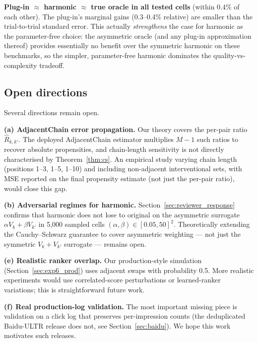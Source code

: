 \documentclass[sigconf]{acmart}
\begin{document}
\noindent\textbf{Plug-in $\approx$ harmonic $\approx$ true oracle in all
tested cells} (within $0.4\%$ of each other). The plug-in's marginal gains
(0.3--0.4\% relative) are smaller than the trial-to-trial standard error.
This actually \emph{strengthens} the case for harmonic as the parameter-free
choice: the asymmetric oracle (and any plug-in approximation thereof)
provides essentially no benefit over the symmetric harmonic on these
benchmarks, so the simpler, parameter-free harmonic dominates the
quality-vs-complexity tradeoff.

\subsection{Open directions}
Several directions remain open.

\textbf{(a) AdjacentChain error propagation.}
Our theory covers the per-pair ratio $\hat{R}_{k,k'}$. The deployed AdjacentChain estimator
multiplies $M-1$ such ratios to recover absolute propensities, and chain-length sensitivity is
not directly characterised by Theorem~\ref{thm:cs}. An empirical study varying chain
length (positions 1--3, 1--5, 1--10) and including non-adjacent interventional sets, with MSE
reported on the final propensity estimate (not just the per-pair ratio), would close this gap.

\textbf{(b) Adversarial regimes for harmonic.}
Section~\ref{sec:reviewer_response} confirms that harmonic does not lose to
original on the asymmetric surrogate $\alpha V_k+\beta V_{k'}$ in 5{,}000
sampled cells $(\alpha,\beta)\in[0.05,50]^2$. Theoretically extending the
Cauchy--Schwarz guarantee to cover asymmetric weighting --- not just the
symmetric $V_k+V_{k'}$ surrogate --- remains open.

\textbf{(e) Realistic ranker overlap.}
Our production-style simulation (Section~\ref{sec:exp6_prod}) uses adjacent swaps with
probability 0.5. More realistic experiments would use correlated-score perturbations or
learned-ranker variations; this is straightforward future work.

\textbf{(f) Real production-log validation.}
The most important missing piece is validation on a click log that preserves per-impression
counts (the deduplicated Baidu-ULTR release does not, see Section~\ref{sec:baidu}). We hope this
work motivates such releases.





\end{document}
